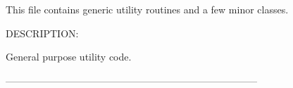  
\setlength{\oldparskip}{\parskip}
\setlength{\parskip}{1.5ex}
\setlength{\oldparindent}{\parindent}
\setlength{\parindent}{0pt}
\setlength{\oldbaselineskip}{\baselineskip}
\setlength{\baselineskip}{11pt}
 
\def\bv{\begin{verbatim}}
\def\ev{\end{verbatim}}
\def\be{\begin{equation}}
\def\ee{\end{equation}}
\def\bea{\begin{eqnarray}}
\def\eea{\end{eqnarray}}
\def\bi{\begin{itemize}}
\def\ei{\end{itemize}}
\def\bn{\begin{enumerate}}
\def\en{\end{enumerate}}
\def\bd{\begin{description}}
\def\ed{\end{description}}
\def\({\left (}
\def\){\right )}
\def\[{\left [}
\def\]{\right ]}
\def\<{\left  \langle}
\def\>{\right \rangle}
\def\cI{{\cal I}}
\def\diag{\mathop{\rm diag}}
\def\tr{\mathop{\rm tr}}


 

   This file contains generic utility routines and a few minor classes.
  
{\sf DESCRIPTION:\\ }


   General purpose utility code.
  
  -----------------------------------------------------------------------------
  

